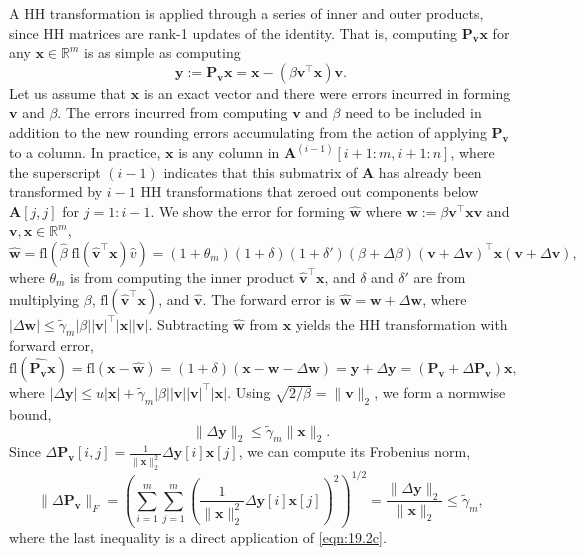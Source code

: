 \documentclass[review,onefignum,onetabnum]{siamart190516}
\newcommand{\R}{\mathbb{R}}
\newcommand{\dd}{\delta}
\newcommand{\tth}{\theta}
\newcommand{\bb}[1]{\mathbf{#1}}
\newcommand{\fl}{\mathrm{fl}}
\begin{document}
A HH transformation is applied through a series of inner and outer products, since HH matrices are rank-1 updates of the identity. 
That is, computing  $\bb{P}_{\bb{v}}\bb{x}$ for any $\bb{x}\in\R^{m}$ is as simple as computing 
\begin{equation}
	\bb{y}:=\bb{P}_{\bb{v}}\bb{x} = \bb{x} - (\beta \bb{v}^{\top}\bb{x})\bb{v}.\label{eqn:effH}
\end{equation}
Let us assume that $\bb{x}$ is an exact vector and there were errors incurred in forming $\bb{v}$ and $\beta$. 
The errors incurred from computing $\bb{v}$ and $\beta$ need to be included in addition to the new rounding errors accumulating from the action of applying $\bb{P}_{\bb{v}}$ to a column.
In practice, $\bb{x}$ is any column in $\bb{A}^{(i-1)}[i+1:m, i+1:n]$, where the superscript $(i-1)$ indicates that this submatrix of $\bb{A}$ has already been transformed by $i-1$ HH transformations that zeroed out components below $\bb{A}[j,j]$ for $j = 1:i-1$.
We show the error for forming $\hat{\bb{w}}$ where $\bb{w}:=\beta\bb{v}^{\top}\bb{x}\bb{v}$ and $\bb{v},\bb{x}\in\R^{m}$,
\begin{equation*}
\hat{\bb{w}} =\fl(\hat{\beta}\;\fl(\hat{\bb{v}}^{\top}\bb{x})\hat{v})=(1+\tth_{m})(1+\dd)(1+\dd')(\beta+\Delta\beta)(\bb{v}+\Delta \bb{v})^{\top}\bb{x}(\bb{v}+\Delta \bb{v}),
\end{equation*}
where $\tth_{m}$ is from computing the inner product $\hat{\bb{v}}^{\top}\bb{x}$, and $\dd$ and $\dd'$ are from multiplying $\beta$, $\fl(\hat{\bb{v}}^{\top}\bb{x})$, and $\bb{\hat{v}}$.
The forward error is
$\hat{\bb{w}} = \bb{w} + \Delta \bb{w}$, where $|\Delta \bb{w}| \leq \tilde{\gamma}_m|\beta||\bb{v}|^{\top}|\bb{x}||\bb{v}|.$
Subtracting $\hat{\bb{w}}$ from $\bb{x}$ yields the HH transformation with forward error,
\begin{equation}
\fl(\hat{\bb{P_v}}\bb{x}) = \fl(\bb{x}-\bb{\hat{w}}) = (1+\dd)(\bb{x}-\bb{w}-\Delta \bb{w}) = \bb{y} + \Delta \bb{y} = (\bb{P_v} + \Delta \bb{P_v})\bb{x},\label{eqn:applyP}
\end{equation}
where $|\Delta \bb{y}| \leq u|\bb{x}| + \tilde{\gamma}_{m} |\beta||\bb{v}||\bb{v}|^{\top}|\bb{x}|$.
Using $\sqrt{2/\beta} = \|\bb{v}\|_2$, we form a normwise bound,
\begin{equation}
\|\Delta \bb{y}\|_2 \leq \tilde{\gamma}_{m}\|\bb{x}\|_2. \label{eqn:19.2c}
\end{equation}
Since $\Delta \bb{P_v}[i,j] = \frac{1}{\|\bb{x}\|_2^2}\Delta \bb{y}[i]\bb{x}[j]$, we can compute its Frobenius norm,
	\begin{equation}
	\|\Delta \bb{P_v}\|_F
	= \left(\sum_{i=1}^m\sum_{j=1}^m\left(\frac{1}{\|\bb{x}\|_2^2}\Delta \bb{y}[i]\bb{x}[j]\right)^2\right)^{1/2}
	=  \frac{\|\Delta \bb{y}\|_2}{\|\bb{x}\|_2} \leq \tilde{\gamma}_{m}\label{eqn:outer},
	\end{equation}
where the last inequality is a direct application of \cref{eqn:19.2c}.
\end{document}
